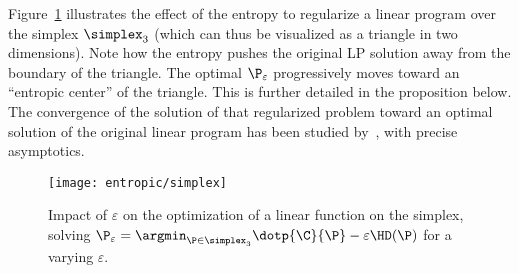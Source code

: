 Figure~\ref{fig-impact-eps} illustrates the effect of the entropy to regularize a linear program over the simplex $\simplex_3$ (which can thus be visualized as a triangle in two dimensions). Note how the entropy pushes the original LP solution away from the boundary of the triangle. The optimal $\P_\varepsilon$ progressively moves toward an ``entropic center'' of the triangle. This is further detailed in the proposition below. The convergence of the solution of that regularized problem toward an optimal solution of the original linear program has been studied by~\citet{CominettiAsympt}, with precise asymptotics.


\begin{figure}[h!]
\centering
\texttt{[image: entropic/simplex]}
\caption{\label{fig-impact-eps}
Impact of $\varepsilon$ on the optimization of a linear function on the simplex, solving $\P_\varepsilon = \argmin_{\P \in \simplex_3} \dotp{\C}{\P}-\varepsilon\HD(\P)$ for a varying $\varepsilon$. 
}
\end{figure}


